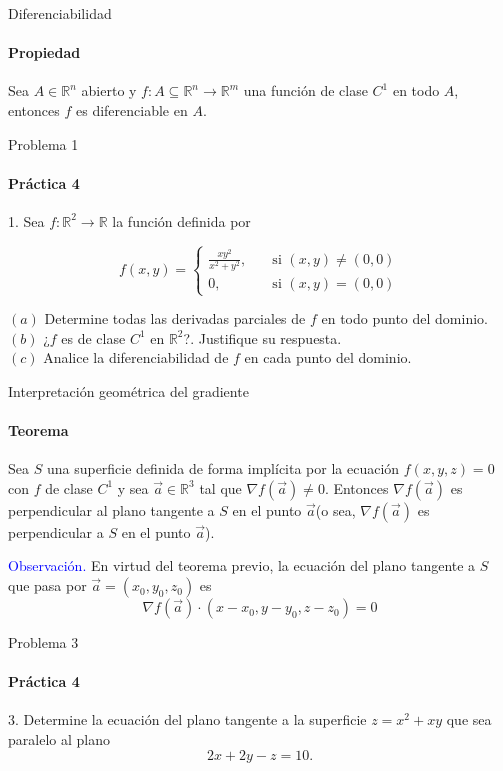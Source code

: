 \documentclass{plantillaPPt}
\begin{document}
\begin{frame}{Diferenciabilidad}
\framesubtitle{Propiedad}

\begin{teorema}
    Sea \(A\in\mathbb{R}^n\) abierto y \(f:A\subseteq\mathbb{R}^n\to\mathbb{R}^m\) una función de clase \(C^1\) en todo \(A\), entonces \(f\) es diferenciable en \(A\).
\end{teorema}
    
\end{frame}

\begin{frame}{Problema 1}
\framesubtitle{Práctica 4}

1. Sea \(f:\mathbb{R}^2\to\mathbb{R}\) la función definida por

\[
f(x,y) = 
\begin{cases}
\frac{xy^2}{x^2+y^2}, \quad & \text{si } (x,y) \neq (0,0)\\
0, \quad &\text{si } (x,y) = (0,0) 
\end{cases}
\]

\((a)\) Determine todas las derivadas parciales de \(f\) en todo punto del dominio.\\
\((b)\) ¿\(f\) es de clase \(C^1\) en \(\mathbb{R}^2\)?. Justifique su respuesta.\\
\((c)\) Analice la diferenciabilidad de \(f\) en cada punto del dominio.
\end{frame}


\begin{frame}{Interpretación geométrica del gradiente}
\framesubtitle{Teorema}

\begin{teorema}
    Sea \(S\) una superficie definida de forma implícita por la ecuación \(f(x,y,z)=0\) con \(f\) de clase \(C^1\) y sea \(\vec{a}\in\mathbb{R}^3\) tal que \(\nabla f(\vec{a})\neq 0\). Entonces \(\nabla f(\vec{a})\) es perpendicular al plano tangente a \(S\) en el punto \(\vec{a}\)(o sea, \(\nabla f(\vec{a})\) es perpendicular a \(S\) en el punto \(\vec{a}\)).
\end{teorema}
\vspace{0.75cm}
\textcolor{blue}{Observación. }En virtud del teorema previo, la ecuación del plano tangente a \(S\) que pasa por \(\vec{a} = (x_0,y_0,z_0)\) es
\[
\nabla f(\vec{a}) \cdot (x-x_0, y-y_0, z-z_0) = 0
\]
\end{frame}

\begin{frame}{Problema 3}
\framesubtitle{Práctica 4}

3. Determine la ecuación del plano tangente a la superficie \(z=x^2+xy\) que sea paralelo al plano
\[2x+2y-z=10.\]
    
\end{frame}
\end{document}
